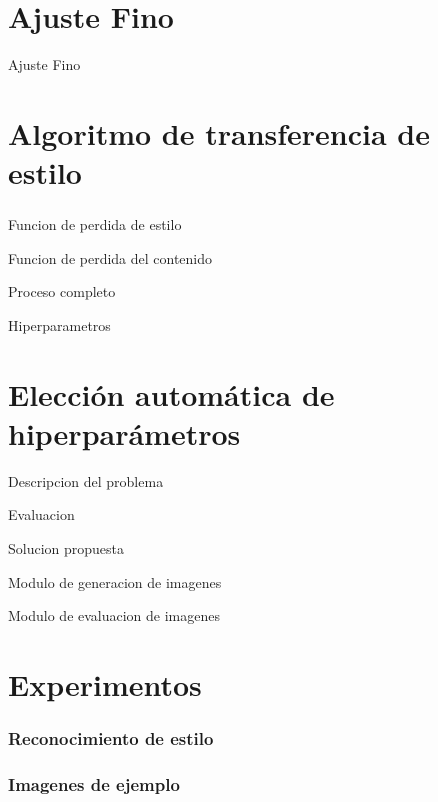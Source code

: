 \documentclass[12pt,center]{beamer}
\begin{document}
\section{Ajuste Fino}
\begin{frame}
 Ajuste Fino
\end{frame}


\section{Algoritmo de transferencia de estilo}
\begin{frame}
 \frametitle{}
 Funcion de perdida de estilo
\end{frame}
\begin{frame}
 Funcion de perdida del contenido
\end{frame}
\begin{frame}
 Proceso completo
\end{frame}

\begin{frame}
Hiperparametros
\end{frame}


\section{Elección automática de hiperparámetros}
\begin{frame}
 Descripcion del problema
\end{frame}
\begin{frame}
 Evaluacion
\end{frame}
\begin{frame}
  Solucion propuesta
\end{frame}
\begin{frame}
  Modulo de generacion de imagenes
\end{frame}
\begin{frame}
  Modulo de evaluacion de imagenes
\end{frame}

\section{Experimentos}
  \begin{frame}
    \frametitle{Reconocimiento de estilo}
  \end{frame}

  \begin{frame}
    \frametitle{Imagenes de ejemplo}
  \end{frame}
\end{document}
